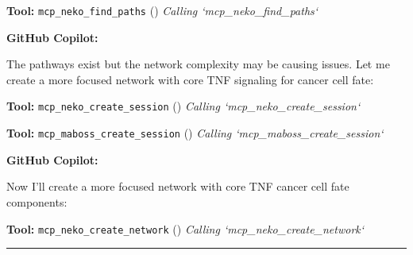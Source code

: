 \documentclass[11pt,a4paper]{article}
\begin{document}
\begin{toolokbox}
\textbf{Tool:} \texttt{mcp\_neko\_find\_paths} (\checkmark)
\textit{Calling `mcp\_neko\_find\_paths`}
\end{toolokbox}
\begin{copilotbox}
\textbf{GitHub Copilot:}

The pathways exist but the network complexity may be causing issues. Let me create a more focused network with core TNF signaling for cancer cell fate:

\end{copilotbox}
\begin{toolokbox}
\textbf{Tool:} \texttt{mcp\_neko\_create\_session} (\checkmark)
\textit{Calling `mcp\_neko\_create\_session`}
\end{toolokbox}
\begin{toolokbox}
\textbf{Tool:} \texttt{mcp\_maboss\_create\_session} (\checkmark)
\textit{Calling `mcp\_maboss\_create\_session`}
\end{toolokbox}
\begin{copilotbox}
\textbf{GitHub Copilot:}

Now I'll create a more focused network with core TNF cancer cell fate components:

\end{copilotbox}
\begin{toolokbox}
\textbf{Tool:} \texttt{mcp\_neko\_create\_network} (\checkmark)
\textit{Calling `mcp\_neko\_create\_network`}
\end{toolokbox}
\bigskip\hrule\bigskip
\end{document}
